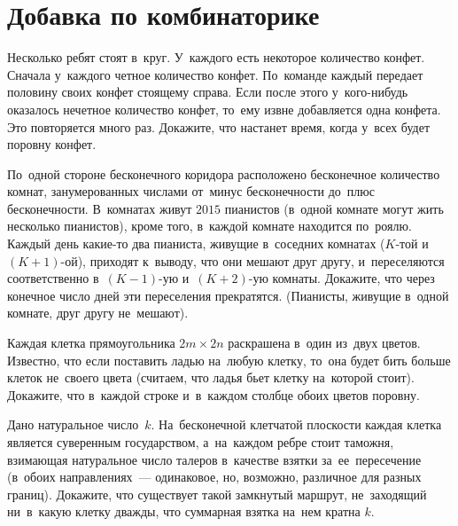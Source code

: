 
\section*{Добавка по комбинаторике}


\begin{problems}

\item
Несколько ребят стоят в~круг.
У~каждого есть некоторое количество конфет.
Сначала у~каждого четное количество конфет.
По~команде каждый передает половину своих конфет стоящему справа.
Если после этого у~кого-нибудь оказалось нечетное количество конфет, то~ему
извне добавляется одна конфета.
Это повторяется много раз.
Докажите, что настанет время, когда у~всех будет поровну конфет.

\item
По~одной стороне бесконечного коридора расположено бесконечное количество
комнат, занумерованных числами от~минус бесконечности до~плюс бесконечности.
В~комнатах живут $2015$ пианистов (в~одной комнате могут жить несколько
пианистов), кроме того, в~каждой комнате находится по~роялю.
Каждый день какие-то два пианиста, живущие в~соседних комнатах
($K$-той и~$(K + 1)$-ой), приходят к~выводу, что они мешают друг другу,
и~переселяются соответственно в~$(K - 1)$-ую и~$(K + 2)$-ую комнаты.
Докажите, что через конечное число дней эти переселения прекратятся.
(Пианисты, живущие в~одной комнате, друг другу не~мешают).

\item
Каждая клетка прямоугольника $2 m \times 2 n$ раскрашена в~один из~двух цветов.
Известно, что если поставить ладью на~любую клетку, то~она будет бить больше
клеток не~своего цвета (считаем, что ладья бьет клетку на~которой стоит).
Докажите, что в~каждой строке и~в~каждом столбце обоих цветов поровну.

\item
Дано натуральное число~$k$.
На~бесконечной клетчатой плоскости каждая клетка является суверенным
государством, а~на~каждом ребре стоит таможня, взимающая натуральное число
талеров в~качестве взятки за~ее~пересечение (в~обоих направлениях~---
одинаковое, но, возможно, различное для разных границ).
Докажите, что существует такой замкнутый маршрут, не~заходящий ни~в~какую
клетку дважды, что суммарная взятка на~нем кратна $k$.

\end{problems}

